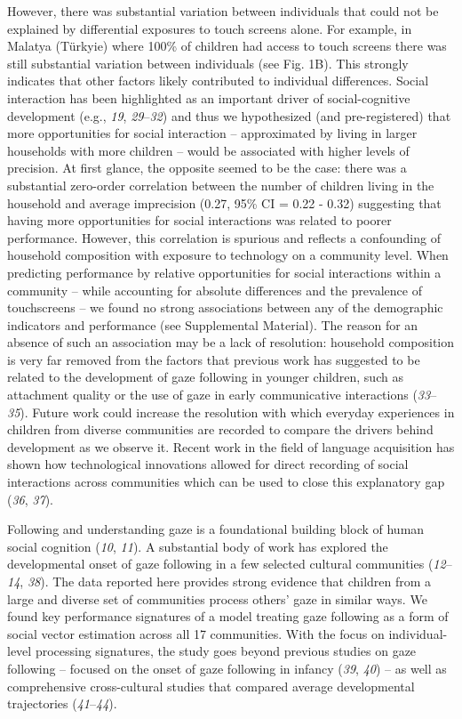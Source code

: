 \documentclass[
  man,floatsintext]{apa6}
\begin{document}
However, there was substantial variation between individuals that could not be explained by differential exposures to touch screens alone. For example, in Malatya (Türkyie) where 100\% of children had access to touch screens there was still substantial variation between individuals (see Fig. 1B). This strongly indicates that other factors likely contributed to individual differences. Social interaction has been highlighted as an important driver of social-cognitive development (e.g., \emph{19}, \emph{29}--\emph{32}) and thus we hypothesized (and pre-registered) that more opportunities for social interaction -- approximated by living in larger households with more children -- would be associated with higher levels of precision. At first glance, the opposite seemed to be the case: there was a substantial zero-order correlation between the number of children living in the household and average imprecision (0.27, 95\% CI = 0.22 - 0.32) suggesting that having more opportunities for social interactions was related to poorer performance. However, this correlation is spurious and reflects a confounding of household composition with exposure to technology on a community level. When predicting performance by relative opportunities for social interactions within a community -- while accounting for absolute differences and the prevalence of touchscreens -- we found no strong associations between any of the demographic indicators and performance (see Supplemental Material). The reason for an absence of such an association may be a lack of resolution: household composition is very far removed from the factors that previous work has suggested to be related to the development of gaze following in younger children, such as attachment quality or the use of gaze in early communicative interactions (\emph{33}--\emph{35}). Future work could increase the resolution with which everyday experiences in children from diverse communities are recorded to compare the drivers behind development as we observe it. Recent work in the field of language acquisition has shown how technological innovations allowed for direct recording of social interactions across communities which can be used to close this explanatory gap (\emph{36}, \emph{37}).

Following and understanding gaze is a foundational building block of human social cognition (\emph{10}, \emph{11}). A substantial body of work has explored the developmental onset of gaze following in a few selected cultural communities (\emph{12}--\emph{14}, \emph{38}). The data reported here provides strong evidence that children from a large and diverse set of communities process others' gaze in similar ways. We found key performance signatures of a model treating gaze following as a form of social vector estimation across all 17 communities. With the focus on individual-level processing signatures, the study goes beyond previous studies on gaze following -- focused on the onset of gaze following in infancy (\emph{39}, \emph{40}) -- as well as comprehensive cross-cultural studies that compared average developmental trajectories (\emph{41}--\emph{44}).
\end{document}
